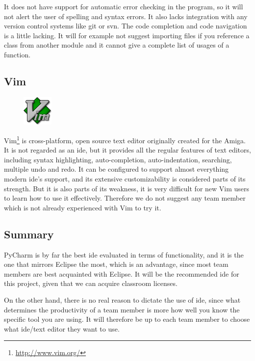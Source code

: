 It does not have support for automatic error checking in the program, so it
will not alert the user of spelling and syntax errors. It also lacks integration
with any version control systems like git or svn. The code completion and
code navigation is a little lacking. It will for example not suggest importing
files if you reference a class from another module and it cannot give a
complete list of usages of a function.

\subsection{Vim}
\begin{figure}
	\vspace{-20pt}
	\includegraphics[width=1.5cm]{./planning/img/vim_logo}
	\vspace{-20pt}
\end{figure}
Vim\footnote{\url{http://www.vim.org/}} is cross-platform, open source text
editor originally created for the Amiga. It is not regarded as an \Gls{ide}, but it
provides all the regular features of text editors, including syntax
highlighting, auto-completion, auto-indentation, searching, multiple undo and
redo. It can be configured to support almost everything modern \Gls{ide}’s support,
and its extensive customizability is considered parts of its strength. But it
is also parts of its weakness, it is very difficult for new Vim users to learn
how to use it effectively. Therefore we do not suggest any team member which is
not already experienced with Vim to try it.

\subsection{Summary}
PyCharm is by far the best \Gls{ide} evaluated in terms of functionality, and it is
the one that mirrors \Gls{Eclipse} the most, which is an advantage, since most team
members are best acquainted with \Gls{Eclipse}. It will be the recommended \Gls{ide} for
this project, given that we can acquire classroom licenses.

On the other hand, there is no real reason to dictate the use of \Gls{ide}, since
what determines the productivity of a team member is more how well you know
the specific tool you are using. It will therefore be up to each team member
to choose what \Gls{ide}/text editor they want to use.


